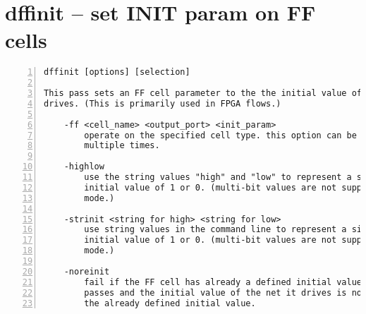 \section{dffinit -- set INIT param on FF cells}
\label{cmd:dffinit}
\begin{lstlisting}[numbers=left,frame=single]
    dffinit [options] [selection]

This pass sets an FF cell parameter to the the initial value of the net it
drives. (This is primarily used in FPGA flows.)

    -ff <cell_name> <output_port> <init_param>
        operate on the specified cell type. this option can be used
        multiple times.

    -highlow
        use the string values "high" and "low" to represent a single-bit
        initial value of 1 or 0. (multi-bit values are not supported in this
        mode.)

    -strinit <string for high> <string for low> 
        use string values in the command line to represent a single-bit
        initial value of 1 or 0. (multi-bit values are not supported in this
        mode.)

    -noreinit
        fail if the FF cell has already a defined initial value set in other
        passes and the initial value of the net it drives is not equal to
        the already defined initial value.
\end{lstlisting}

